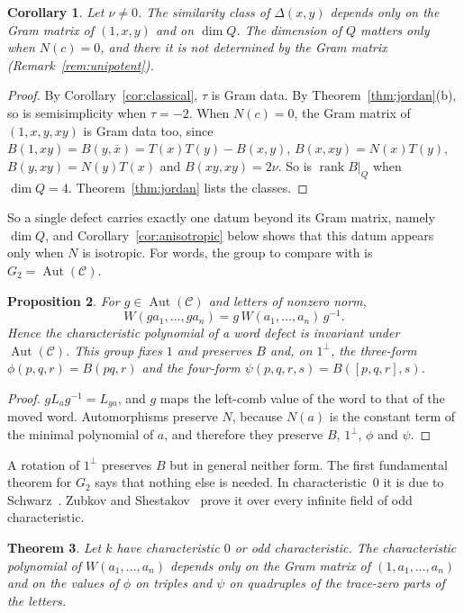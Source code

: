 \documentclass[11pt]{amsart}
\newtheorem{theorem}{Theorem}[section]
\newtheorem{proposition}[theorem]{Proposition}
\newtheorem{corollary}[theorem]{Corollary}
\theoremstyle{definition}
\theoremstyle{remark}
\newcommand{\C}{\mathcal{C}}
\newcommand{\conj}[1]{\overline{#1}}
\newcommand{\assoc}[3]{[#1,#2,#3]}
\DeclareMathOperator{\rank}{rank}
\begin{document}
\begin{corollary}\label{cor:gram-dimq}
Let $\nu\neq0$. The similarity class of $\Delta(x,y)$ depends only on the Gram
matrix of $(1,x,y)$ and on $\dim Q$. The dimension of $Q$ matters only when
$N(c)=0$, and there it is not determined by the Gram matrix
(Remark~\ref{rem:unipotent}).
\end{corollary}

\begin{proof}
By Corollary~\ref{cor:classical}, $\tau$ is Gram data. By
Theorem~\ref{thm:jordan}(b), so is semisimplicity when $\tau=-2$. When
$N(c)=0$, the Gram matrix of $(1,x,y,xy)$ is Gram data too, since
$B(1,xy)=B(y,\conj x)=T(x)T(y)-B(x,y)$, $B(x,xy)=N(x)T(y)$,
$B(y,xy)=N(y)T(x)$ and $B(xy,xy)=2\nu$. So is $\rank B|_Q$ when $\dim Q=4$.
Theorem~\ref{thm:jordan} lists the classes.
\end{proof}

So a single defect carries exactly one datum beyond its Gram matrix, namely
$\dim Q$, and Corollary~\ref{cor:anisotropic} below shows that this datum
appears only when $N$ is isotropic. For words, the group to compare with is
$G_2=\operatorname{Aut}(\C)$.

\begin{proposition}\label{prop:equivariant}
For $g\in\operatorname{Aut}(\C)$ and letters of nonzero norm,
\[
  W(ga_1,\dots,ga_n)=g\,W(a_1,\dots,a_n)\,g^{-1}.
\]
Hence the characteristic polynomial of a word defect is invariant under
$\operatorname{Aut}(\C)$. This group fixes $1$ and preserves $B$ and, on
$1^\perp$, the three-form $\phi(p,q,r)=B(pq,r)$ and the four-form
$\psi(p,q,r,s)=B(\assoc pqr,s)$.
\end{proposition}

\begin{proof}
$gL_ag^{-1}=L_{ga}$, and $g$ maps the left-comb value of the word to that of
the moved word. Automorphisms preserve $N$, because $N(a)$ is the constant
term of the minimal polynomial of $a$, and therefore they preserve $B$, $1^\perp$, $\phi$ and
$\psi$.
\end{proof}

A rotation of $1^\perp$ preserves $B$ but in general neither form. The first
fundamental theorem for $G_2$ says that nothing else is needed. In
characteristic~$0$ it is due to Schwarz~\cite{schwarz1988}. Zubkov and
Shestakov~\cite[Cor.~7.11, Rem.~7.12]{zubkov-shestakov} prove it over every
infinite field of odd characteristic.

\begin{theorem}\label{thm:g2}
Let $k$ have characteristic $0$ or odd characteristic. The characteristic
polynomial of $W(a_1,\dots,a_n)$ depends only on the Gram matrix of
$(1,a_1,\dots,a_n)$ and on the values of $\phi$ on triples and $\psi$ on
quadruples of the trace-zero parts of the letters.
\end{theorem}
\end{document}
